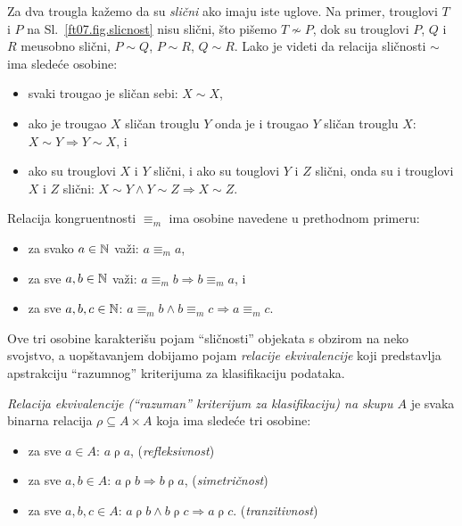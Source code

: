 \begin{EX}
Za dva trougla ka\v zemo da su \emph{sli\v cni} ako imaju iste
uglove. Na primer, trouglovi $T$ i $P$ na Sl.~\ref{ft07.fig.slicnost} nisu sli\v cni, \v sto
pi\v semo $T \not\sim P$, dok su trouglovi $P$, $Q$ i $R$ me\dj usobno sli\v cni,
$P \sim Q$, $P \sim R$, $Q \sim R$.
Lako je videti da relacija sli\v cnosti $\sim$ ima slede\'ce osobine:
\begin{itemize}\itemsep -1.5pt
\item svaki trougao je sli\v can sebi: $X \sim X$,
\item ako je trougao $X$ sli\v can trouglu $Y$ onda je i trougao $Y$ sli\v can trouglu $X$:\newline
      $X \sim Y \Rightarrow Y \sim X$, i
\item ako su trouglovi $X$ i $Y$ sli\v cni, i ako su touglovi $Y$ i $Z$ sli\v cni, onda su i trouglovi $X$ i $Z$ sli\v cni:
      $X \sim Y \land Y \sim Z \Rightarrow X \sim Z$.
\end{itemize}
\end{EX}

\begin{EX}
    Relacija kongruentnosti $\equiv_m$ ima osobine navedene u prethodnom primeru:
    \begin{itemize}
    \item za svako $a \in \mathbb{N}$ va\v zi: $a \equiv_m a$,
    \item za sve $a, b \in \mathbb{N}$ va\v zi: $a \equiv_m b \Rightarrow b \equiv_m a$, i
    \item za sve $a, b, c \in \mathbb{N}$: $a \equiv_m b \land b \equiv_m c \Rightarrow a \equiv_m c$.
    \end{itemize}
\end{EX}

Ove tri osobine karakteri\v su pojam \enquote{sli\v cnosti} objekata s obzirom na neko svojstvo, a uop\v stavanjem
dobijamo pojam \emph{relacije ekvivalencije} koji predstavlja apstrakciju \enquote{razumnog} kriterijuma za klasifikaciju podataka.

\begin{DEF}
    \emph{Relacija ekvivalencije (\enquote{razuman} kriterijum za klasifikaciju) na skupu $A$} je svaka binarna relacija $\rho \subseteq A \times A$
    koja ima slede\'ce tri osobine:
    \begin{itemize}\itemsep -1pt
    \item za sve $a \in A$: $a \mathrel{\rho} a$, \hfill (\emph{refleksivnost})
    \item za sve $a, b \in A$: $a \mathrel{\rho} b \Rightarrow b \mathrel{\rho} a$, \hfill (\emph{simetri\v cnost})
    \item za sve $a, b, c \in A$: $a \mathrel{\rho} b \land b \mathrel{\rho} c \Rightarrow a \mathrel{\rho} c$. \hfill (\emph{tranzitivnost})
    \end{itemize}
\end{DEF}

